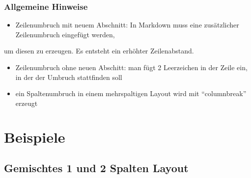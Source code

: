 \documentclass[
  a4paper,
  twoside]{article}
\providecommand{\tightlist}{%
  \setlength{\itemsep}{0pt}\setlength{\parskip}{0pt}}
\begin{document}
\hypertarget{allgemeine-hinweise}{%
\subsubsection{Allgemeine Hinweise}\label{allgemeine-hinweise}}

\begin{itemize}
\tightlist
\item
  Zeilenumbruch mit neuem Abschnitt: In Markdown muss eine zusätzlicher Zeilenumbruch eingefügt werden,
\end{itemize}

um diesen zu erzeugen. Es entsteht ein erhöhter Zeilenabstand.

\begin{itemize}
\item
  Zeilenumbruch ohne neuen Abschitt: man fügt 2 Leerzeichen in der Zeile ein,\\
  in der der Umbruch stattfinden soll
\item
  ein Spaltenumbruch in einem mehrspaltigen Layout wird mit ``columnbreak'' erzeugt
\end{itemize}

\newpage

\hypertarget{beispiele-1}{%
\section{Beispiele}\label{beispiele-1}}

\hypertarget{gemischtes-1-und-2-spalten-layout}{%
\subsection{Gemischtes 1 und 2 Spalten Layout}\label{gemischtes-1-und-2-spalten-layout}}
\end{document}
